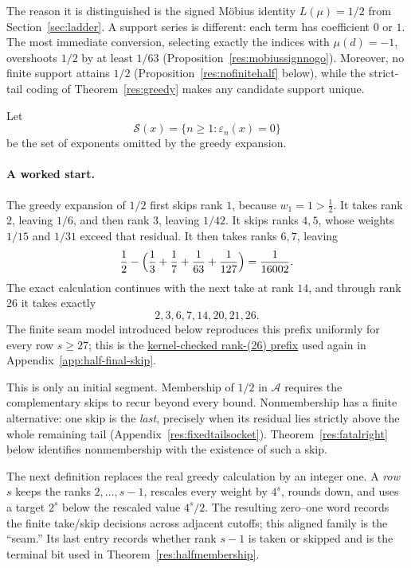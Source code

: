 \documentclass[11pt]{article}
\newcommand{\commit}{bb4e24651b37cd096d3749ef299c3317930b3a3b}
\newcommand{\repobase}{https://github.com/wcook04/plectis-lean-erdos249-257/blob/\commit}
\newcommand{\PK}{Erdos249257}
\newcommand{\lword}[4]{\href{\repobase/\PK/#1\#L#2}{#4}}
\theoremstyle{definition}
\theoremstyle{remark}
\begin{document}
The reason it is distinguished is the signed M\"obius identity
\(L(\mu)=1/2\) from Section~\ref{sec:ladder}.  A support series is different:
each term has coefficient \(0\) or \(1\).  The most immediate conversion,
selecting exactly the indices with \(\mu(d)=-1\), overshoots \(1/2\) by at
least \(1/63\) (Proposition~\ref{res:mobiussignnogo}).  Moreover, no finite
support attains \(1/2\) (Proposition~\ref{res:nofinitehalf} below), while the
strict-tail coding of Theorem~\ref{res:greedy} makes any candidate support
unique.

Let
\[
 \mathcal S(x)=\{n\geq1:\varepsilon_n(x)=0\}
\]
be the set of exponents omitted by the greedy expansion.

\paragraph{A worked start.}
The greedy expansion of \(1/2\) first skips rank \(1\), because
\(w_1=1>\tfrac12\).  It takes rank \(2\), leaving \(1/6\), and then rank
\(3\), leaving \(1/42\).  It skips ranks \(4,5\), whose weights \(1/15\)
and \(1/31\) exceed that residual.  It then takes ranks \(6,7\), leaving
\[
 \frac12-\Bigl(\frac13+\frac17+\frac1{63}+\frac1{127}\Bigr)
 =\frac1{16002}.
\]
The exact calculation continues with the next take at rank \(14\), and through
rank \(26\) it takes exactly
\[
 2,3,6,7,14,20,21,26.
\]
The finite seam model introduced below reproduces this prefix uniformly for
every row \(s\geq27\); this is the
\lword{HalfFinalMiddlePhaseSieve.lean}{899}{seamGreedyBits_head2367_14_20_21_26}{kernel-checked rank-(26) prefix}
used again in Appendix~\ref{app:half-final-skip}.

This is only an initial segment.  Membership of \(1/2\) in \(\mathcal A\)
requires the complementary skips to recur beyond every bound.  Nonmembership
has a finite alternative: one skip is the \emph{last}, precisely when its
residual lies strictly above the whole remaining tail
(Appendix~\ref{res:fixedtailsocket}).  Theorem~\ref{res:fatalright} below
identifies nonmembership with the existence of such a skip.

The next definition replaces the real greedy calculation by an integer one.
A \emph{row} \(s\) keeps the ranks \(2,\ldots,s-1\), rescales every weight by
\(4^s\), rounds down, and uses a target \(2^s\) below the rescaled value
\(4^s/2\).  The resulting zero--one word records the finite take/skip
decisions across adjacent cutoffs; this aligned family is the ``seam.''  Its
last entry records whether rank \(s-1\) is taken or skipped and is the terminal
bit used in Theorem~\ref{res:halfmembership}.
\end{document}
